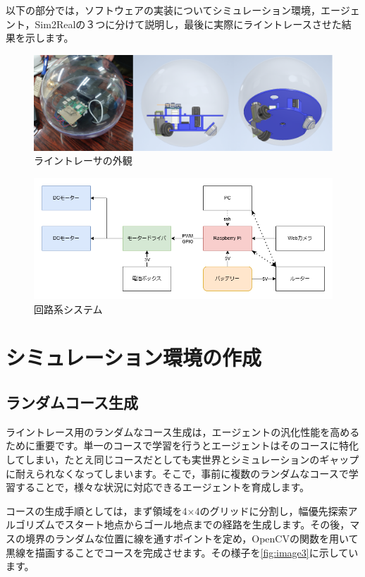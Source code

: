 以下の部分では，ソフトウェアの実装についてシミュレーション環境，エージェント，Sim2Realの３つに分けて説明し，最後に実際にライントレースさせた結果を示します。

\begin{figure}[h]
  \centering
  \includegraphics[width=1\hsize]{line-tracer/fig/image1.png}
  \caption{ライントレーサの外観}
  \label{fig:image1}
\end{figure}

\begin{figure}[h]
  \centering
  \includegraphics[width=1\hsize]{line-tracer/fig/image2.png}
  \caption{回路系システム}
  \label{fig:image2}
\end{figure}

\section{シミュレーション環境の作成}

\subsection{ランダムコース生成}
ライントレース用のランダムなコース生成は，エージェントの汎化性能を高めるために重要です。単一のコースで学習を行うとエージェントはそのコースに特化してしまい，たとえ同じコースだとしても実世界とシミュレーションのギャップに耐えられなくなってしまいます。そこで，事前に複数のランダムなコースで学習することで，様々な状況に対応できるエージェントを育成します。

コースの生成手順としては，まず領域を4×4のグリッドに分割し，幅優先探索アルゴリズムでスタート地点からゴール地点までの経路を生成します。その後，マスの境界のランダムな位置に線を通すポイントを定め，OpenCVの関数を用いて黒線を描画することでコースを完成させます。その様子を\ref{fig:image3}に示しています。


